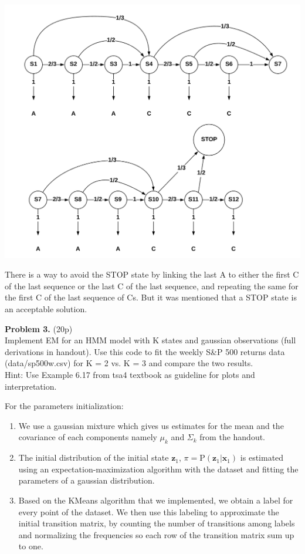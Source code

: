 \documentclass[12pt]{article}
\newcommand{\p}[1]{\mathrm{P}\left(#1 \right)}
\newcommand{\vect}[1]{\mathbf{#1}}
\begin{document}
\begin{center}
	\includegraphics[width=1\linewidth]{figures/problem-2-2.png} 
\end{center}
 There is a way to avoid the STOP state by linking the last A to either the first C of the last sequence or the last C of the last sequence, and repeating the same for the first C of the last sequence of Cs.
 But it was mentioned that a STOP state is an acceptable solution.

\noindent \textbf{Problem 3.}  (20p)\\ 
Implement EM for an HMM model with K states and gaussian observations (full derivations in handout). 
Use this code to fit the weekly S\&P 500 returns data (data/sp500w.csv) for K = 2 vs. K = 3 and compare the two results. \\
Hint: Use Example 6.17 from tsa4 textbook as guideline for plots and interpretation.


For the parameters initialization:
\begin{enumerate}
	\item We use a gaussian mixture which gives us estimates for the mean and the covariance of each components namely $\mu_k$ and $\Sigma_k$ from
the handout.
	\item  The initial distribution of the initial state $\vect{z}_1$, $\pi=\p{\vect{z}_1|\vect{x}_1}$ is estimated using an expectation-maximization algorithm with the dataset and fitting the parameters of a gaussian distribution.
	\item Based on the KMeans algorithm that we implemented, we obtain a label for every point of the dataset. We then use this labeling to approximate the initial transition matrix, by counting the number of transitions among labels 
and normalizing the frequencies so each row of the transition matrix sum up to one.
\end{enumerate}
\end{document}
